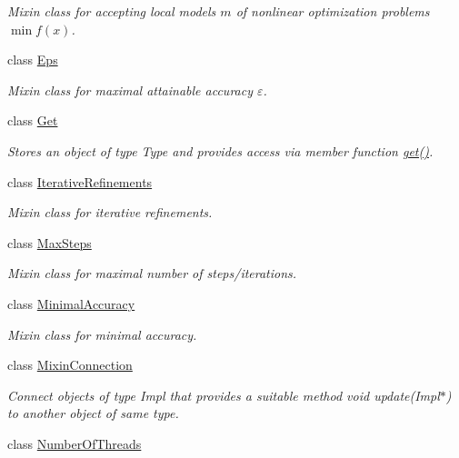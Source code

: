 \begin{DoxyCompactItemize}
\begin{DoxyCompactList}\small\item\em Mixin class for accepting local models $m$ of nonlinear optimization problems $\min f(x)$. \end{DoxyCompactList}\item 
class \hyperlink{classSpacy_1_1Mixin_1_1Eps}{Eps}
\begin{DoxyCompactList}\small\item\em Mixin class for maximal attainable accuracy $\varepsilon$. \end{DoxyCompactList}\item 
class \hyperlink{classSpacy_1_1Mixin_1_1Get}{Get}
\begin{DoxyCompactList}\small\item\em Stores an object of type Type and provides access via member function \hyperlink{classSpacy_1_1Mixin_1_1Get_aaa3afedcb9b9e943f81d1686b70417db}{get()}. \end{DoxyCompactList}\item 
class \hyperlink{classSpacy_1_1Mixin_1_1IterativeRefinements}{Iterative\+Refinements}
\begin{DoxyCompactList}\small\item\em Mixin class for iterative refinements. \end{DoxyCompactList}\item 
class \hyperlink{classSpacy_1_1Mixin_1_1MaxSteps}{Max\+Steps}
\begin{DoxyCompactList}\small\item\em Mixin class for maximal number of steps/iterations. \end{DoxyCompactList}\item 
class \hyperlink{classSpacy_1_1Mixin_1_1MinimalAccuracy}{Minimal\+Accuracy}
\begin{DoxyCompactList}\small\item\em Mixin class for minimal accuracy. \end{DoxyCompactList}\item 
class \hyperlink{classSpacy_1_1Mixin_1_1MixinConnection}{Mixin\+Connection}
\begin{DoxyCompactList}\small\item\em Connect objects of type Impl that provides a suitable method void update(\+Impl$\ast$) to another object of same type. \end{DoxyCompactList}\item 
class \hyperlink{classSpacy_1_1Mixin_1_1NumberOfThreads}{Number\+Of\+Threads}

\end{DoxyCompactItemize}
